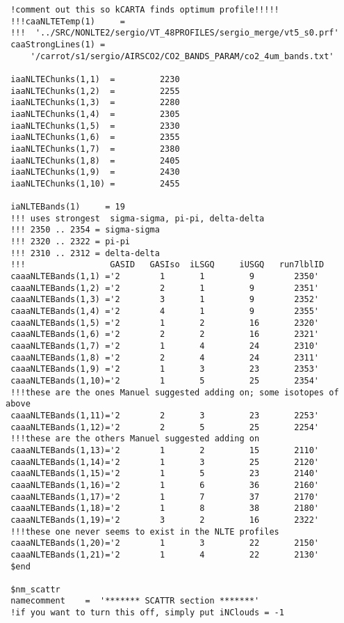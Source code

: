 \documentclass[12pt]{article}
\begin{document}
\begin{scriptsize}
\begin{verbatim}
 !comment out this so kCARTA finds optimum profile!!!!!
 !!!caaNLTETemp(1)     = 
 !!!  '../SRC/NONLTE2/sergio/VT_48PROFILES/sergio_merge/vt5_s0.prf'
 caaStrongLines(1) = 
     '/carrot/s1/sergio/AIRSCO2/CO2_BANDS_PARAM/co2_4um_bands.txt'

 iaaNLTEChunks(1,1)  =         2230
 iaaNLTEChunks(1,2)  =         2255
 iaaNLTEChunks(1,3)  =         2280
 iaaNLTEChunks(1,4)  =         2305
 iaaNLTEChunks(1,5)  =         2330
 iaaNLTEChunks(1,6)  =         2355
 iaaNLTEChunks(1,7)  =         2380
 iaaNLTEChunks(1,8)  =         2405
 iaaNLTEChunks(1,9)  =         2430
 iaaNLTEChunks(1,10) =         2455

 iaNLTEBands(1)     = 19
 !!! uses strongest  sigma-sigma, pi-pi, delta-delta 
 !!! 2350 .. 2354 = sigma-sigma 
 !!! 2320 .. 2322 = pi-pi 
 !!! 2310 .. 2312 = delta-delta 
 !!!                 GASID   GASIso  iLSGQ     iUSGQ   run7lblID 
 caaaNLTEBands(1,1) ='2        1       1         9        2350' 
 caaaNLTEBands(1,2) ='2        2       1         9        2351' 
 caaaNLTEBands(1,3) ='2        3       1         9        2352' 
 caaaNLTEBands(1,4) ='2        4       1         9        2355' 
 caaaNLTEBands(1,5) ='2        1       2         16       2320' 
 caaaNLTEBands(1,6) ='2        2       2         16       2321' 
 caaaNLTEBands(1,7) ='2        1       4         24       2310' 
 caaaNLTEBands(1,8) ='2        2       4         24       2311' 
 caaaNLTEBands(1,9) ='2        1       3         23       2353'  
 caaaNLTEBands(1,10)='2        1       5         25       2354'  
 !!!these are the ones Manuel suggested adding on; some isotopes of above
 caaaNLTEBands(1,11)='2        2       3         23       2253'  
 caaaNLTEBands(1,12)='2        2       5         25       2254'  
 !!!these are the others Manuel suggested adding on
 caaaNLTEBands(1,13)='2        1       2         15       2110'  
 caaaNLTEBands(1,14)='2        1       3         25       2120'  
 caaaNLTEBands(1,15)='2        1       5         23       2140'  
 caaaNLTEBands(1,16)='2        1       6         36       2160'  
 caaaNLTEBands(1,17)='2        1       7         37       2170'  
 caaaNLTEBands(1,18)='2        1       8         38       2180'  
 caaaNLTEBands(1,19)='2        3       2         16       2322'
 !!!these one never seems to exist in the NLTE profiles
 caaaNLTEBands(1,20)='2        1       3         22       2150'  
 caaaNLTEBands(1,21)='2        1       4         22       2130'  
 $end

 $nm_scattr
 namecomment    =  '******* SCATTR section *******'
 !if you want to turn this off, simply put iNClouds = -1
 

\end{verbatim}
\end{scriptsize}
\end{document}
